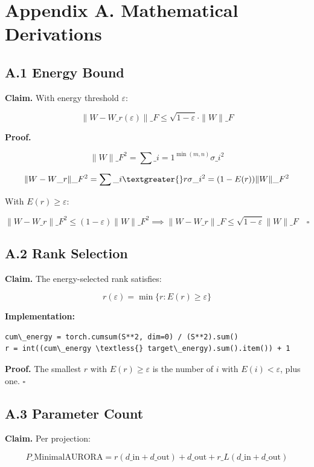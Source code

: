 \section{Appendix A. Mathematical Derivations}

\subsection{A.1 Energy Bound}

\textbf{Claim.} With energy threshold $\varepsilon$:

\[
\|W - W\_{r(\varepsilon)}\|\_F \leq \sqrt{1 - \varepsilon} \cdot \|W\|\_F
\]

\textbf{Proof.}

\[
\|W\|\_F^2 = \sum\_{i=1}^{\min(m,n)} \sigma\_i^2
\]

\[
\|W - W\_r\|\_F^2 = \sum\_{i \textgreater{} r} \sigma\_i^2 = (1 - E(r)) \|W\|\_F^2
\]

With $E(r) \geq \varepsilon$:

\[
\|W - W\_r\|\_F^2 \leq (1 - \varepsilon) \|W\|\_F^2 \implies \|W - W\_r\|\_F \leq \sqrt{1 - \varepsilon} \|W\|\_F \quad \square
\]

\subsection{A.2 Rank Selection}

\textbf{Claim.} The energy-selected rank satisfies:

\[
r(\varepsilon) = \min\{r : E(r) \geq \varepsilon\}
\]

\textbf{Implementation:}

\begin{lstlisting}
cum\_energy = torch.cumsum(S**2, dim=0) / (S**2).sum()
r = int((cum\_energy \textless{} target\_energy).sum().item()) + 1
\end{lstlisting}

\textbf{Proof.} The smallest $r$ with $E(r) \geq \varepsilon$ is the number of 
$i$ with $E(i) < \varepsilon$, plus one. $\square$

\subsection{A.3 Parameter Count}

\textbf{Claim.} Per projection:

\[
P\_\text{MinimalAURORA} = r(d\_\text{in} + d\_\text{out}) + d\_\text{out} + r\_L(d\_\text{in} + d\_\text{out})
\]

